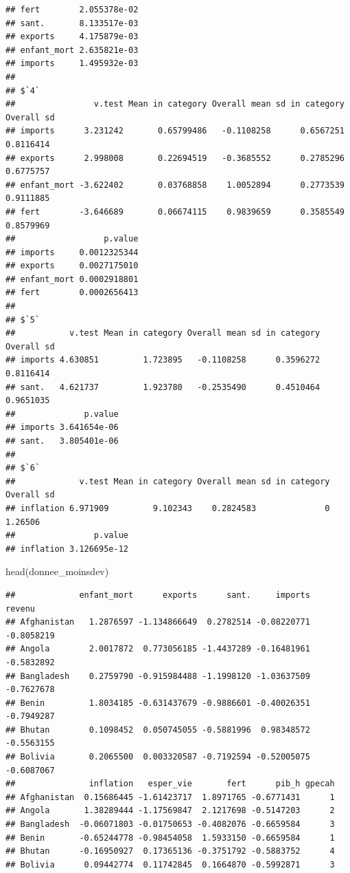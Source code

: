 \documentclass[
]{article}
\newenvironment{Shaded}{}{}
\newcommand{\FunctionTok}[1]{#1}
\newcommand{\NormalTok}[1]{#1}
\begin{document}
\begin{verbatim}
## fert        2.055378e-02
## sant.       8.133517e-03
## exports     4.175879e-03
## enfant_mort 2.635821e-03
## imports     1.495932e-03
## 
## $`4`
##                v.test Mean in category Overall mean sd in category Overall sd
## imports      3.231242       0.65799486   -0.1108258      0.6567251  0.8116414
## exports      2.998008       0.22694519   -0.3685552      0.2785296  0.6775757
## enfant_mort -3.622402       0.03768858    1.0052894      0.2773539  0.9111885
## fert        -3.646689       0.06674115    0.9839659      0.3585549  0.8579969
##                  p.value
## imports     0.0012325344
## exports     0.0027175010
## enfant_mort 0.0002918801
## fert        0.0002656413
## 
## $`5`
##           v.test Mean in category Overall mean sd in category Overall sd
## imports 4.630851         1.723895   -0.1108258      0.3596272  0.8116414
## sant.   4.621737         1.923780   -0.2535490      0.4510464  0.9651035
##              p.value
## imports 3.641654e-06
## sant.   3.805401e-06
## 
## $`6`
##             v.test Mean in category Overall mean sd in category Overall sd
## inflation 6.971909         9.102343    0.2824583              0    1.26506
##                p.value
## inflation 3.126695e-12
\end{verbatim}

\begin{Shaded}
\begin{Highlighting}[]
\FunctionTok{head}\NormalTok{(donnee\_moinsdev)}
\end{Highlighting}
\end{Shaded}

\begin{verbatim}
##             enfant_mort      exports      sant.     imports     revenu
## Afghanistan   1.2876597 -1.134866649  0.2782514 -0.08220771 -0.8058219
## Angola        2.0017872  0.773056185 -1.4437289 -0.16481961 -0.5832892
## Bangladesh    0.2759790 -0.915984488 -1.1998120 -1.03637509 -0.7627678
## Benin         1.8034185 -0.631437679 -0.9886601 -0.40026351 -0.7949287
## Bhutan        0.1098452  0.050745055 -0.5881996  0.98348572 -0.5563155
## Bolivia       0.2065500  0.003320587 -0.7192594 -0.52005075 -0.6087067
##               inflation   esper_vie       fert      pib_h gpecah
## Afghanistan  0.15686445 -1.61423717  1.8971765 -0.6771431      1
## Angola       1.38289444 -1.17569847  2.1217698 -0.5147203      2
## Bangladesh  -0.06071803 -0.01750653 -0.4082076 -0.6659584      3
## Benin       -0.65244778 -0.98454058  1.5933150 -0.6659584      1
## Bhutan      -0.16950927  0.17365136 -0.3751792 -0.5883752      4
## Bolivia      0.09442774  0.11742845  0.1664870 -0.5992871      3
\end{verbatim}
\end{document}
